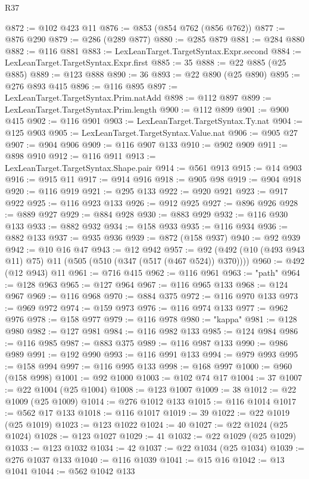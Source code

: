 \begin{lexlean}{R37}
\begin{coremodule}
@872 := @102 @423 @11
@876 := @853 (@854 @762 (@856 @762))
@877 := @876 @290
@879 := @286 (@289 @877)
@880 := @285 @879
@881 := @284 @880
@882 := @116 @881
@883 := LexLeanTarget.TargetSyntax.Expr.second
@884 := LexLeanTarget.TargetSyntax.Expr.first
@885 := 35
@888 := @22 @885 (@25 @885)
@889 := @123 @888
@890 := 36
@893 := @22 @890 (@25 @890)
@895 := @276 @893 @415
@896 := @116 @895
@897 := LexLeanTarget.TargetSyntax.Prim.natAdd
@898 := @112 @897
@899 := LexLeanTarget.TargetSyntax.Prim.length
@900 := @112 @899
@901 := @900 @415
@902 := @116 @901
@903 := LexLeanTarget.TargetSyntax.Ty.nat
@904 := @125 @903
@905 := LexLeanTarget.TargetSyntax.Value.nat
@906 := @905 @27
@907 := @904 @906
@909 := @116 @907 @133
@910 := @902 @909
@911 := @898 @910
@912 := @116 @911
@913 := LexLeanTarget.TargetSyntax.Shape.pair
@914 := @561 @913
@915 := @14 @903
@916 := @915 @11
@917 := @914 @916
@918 := @905 @98
@919 := @904 @918
@920 := @116 @919
@921 := @295 @133
@922 := @920 @921
@923 := @917 @922
@925 := @116 @923 @133
@926 := @912 @925
@927 := @896 @926
@928 := @889 @927
@929 := @884 @928
@930 := @883 @929
@932 := @116 @930 @133
@933 := @882 @932
@934 := @158 @933
@935 := @116 @934
@936 := @882 @133
@937 := @935 @936
@939 := @872 (@158 @937)
@940 := @92 @939
@942 := @10 @16 @47
@943 := @12 @942
@957 := @92 (@492 (@10 (@493 @943 @11) @75) @11 (@505 (@510 (@347 (@517 (@467 @524)) @370))))
@960 := @492 (@12 @943) @11
@961 := @716 @415
@962 := @116 @961
@963 := "path"
@964 := @128 @963
@965 := @127 @964
@967 := @116 @965 @133
@968 := @124 @967
@969 := @116 @968
@970 := @884 @375
@972 := @116 @970 @133
@973 := @969 @972
@974 := @159 @973
@976 := @116 @974 @133
@977 := @962 @976
@978 := @158 @977
@979 := @116 @978
@980 := "kappa"
@981 := @128 @980
@982 := @127 @981
@984 := @116 @982 @133
@985 := @124 @984
@986 := @116 @985
@987 := @883 @375
@989 := @116 @987 @133
@990 := @986 @989
@991 := @192 @990
@993 := @116 @991 @133
@994 := @979 @993
@995 := @158 @994
@997 := @116 @995 @133
@998 := @168 @997
@1000 := @960 (@158 @998)
@1001 := @92 @1000
@1003 := @102 @74 @17
@1004 := 37
@1007 := @22 @1004 (@25 @1004)
@1008 := @123 @1007
@1009 := 38
@1012 := @22 @1009 (@25 @1009)
@1014 := @276 @1012 @133
@1015 := @116 @1014
@1017 := @562 @17 @133
@1018 := @116 @1017
@1019 := 39
@1022 := @22 @1019 (@25 @1019)
@1023 := @123 @1022
@1024 := 40
@1027 := @22 @1024 (@25 @1024)
@1028 := @123 @1027
@1029 := 41
@1032 := @22 @1029 (@25 @1029)
@1033 := @123 @1032
@1034 := 42
@1037 := @22 @1034 (@25 @1034)
@1039 := @276 @1037 @133
@1040 := @116 @1039
@1041 := @15 @16
@1042 := @13 @1041
@1044 := @562 @1042 @133

\end{coremodule}
\end{lexlean}
